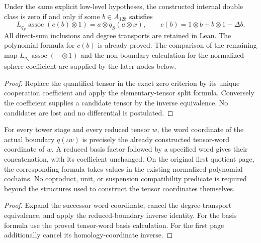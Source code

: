 \begin{proposition}
  \label{prop:h6-internal-square-cooperation-source}
  \leanok
  Under the same explicit low-level hypotheses, the constructed internal
  double class is zero if and only if some $b\in A_{128}$ satisfies
  \[
    L_{q_S}\operatorname{assoc}(c(b)\otimes1)
      =a\otimes q_S(a\otimes x),\qquad
    c(b)=1\otimes b+b\otimes1-\Delta b.
  \]
  All direct-sum inclusions and degree transports are retained in Lean.
  The polynomial formula for $c(b)$ is already proved. The comparison of
  the remaining map $L_{q_S}\operatorname{assoc}(-\otimes1)$ and the
  non-boundary calculation for the normalized sphere coefficient are
  supplied by the later nodes below.
\end{proposition}
\begin{proof}
  Replace the quantified tensor in the exact zero criterion by its unique
  cooperation coefficient and apply the elementary-tensor split formula.
  Conversely the coefficient supplies a candidate tensor by the inverse
  equivalence. No candidates are lost and no differential is postulated.
  \leanok
\end{proof}

\begin{proposition}
  \label{prop:h6-boundary-word-coordinates}
  \leanok
  For every tower stage and every reduced tensor $w$, the word coordinate
  of the actual boundary $q(\iota w)$ is precisely the already constructed
  tensor-word coordinate of $w$. A reduced basis factor followed by a
  specified word gives their concatenation, with its coefficient unchanged.
  On the original first quotient page, the corresponding formula takes
  values in the existing normalized polynomial cochains.
  No coproduct, unit, or suspension compatibility predicate is required
  beyond the structures used to construct the tensor coordinates themselves.
\end{proposition}
\begin{proof}
  Expand the successor word coordinate, cancel the degree-transport
  equivalence, and apply the reduced-boundary inverse identity.
  For the basis formula use the proved tensor-word basis calculation.
  For the first page additionally cancel its homology-coordinate inverse.
  \leanok
\end{proof}

